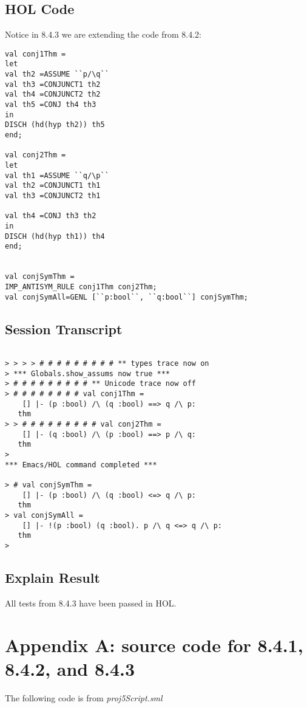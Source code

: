 \documentclass{report}
\begin{document}
\section{HOL Code}
\label{HOl Code 843}
Notice in 8.4.3 we are extending the code from 8.4.2:
\begin{lstlisting}[frame=trBL]
val conj1Thm =
let
val th2 =ASSUME ``p/\q``
val th3 =CONJUNCT1 th2
val th4 =CONJUNCT2 th2
val th5 =CONJ th4 th3
in
DISCH (hd(hyp th2)) th5
end;

val conj2Thm =
let
val th1 =ASSUME ``q/\p``
val th2 =CONJUNCT1 th1
val th3 =CONJUNCT2 th1

val th4 =CONJ th3 th2
in
DISCH (hd(hyp th1)) th4
end;


val conjSymThm =
IMP_ANTISYM_RULE conj1Thm conj2Thm;
val conjSymAll=GENL [``p:bool``, ``q:bool``] conjSymThm;
\end{lstlisting}

\section{Session Transcript}
\label{Session Trans 843}
\setcounter{sessioncount}{0}
\begin{session}
  \begin{scriptsize}
\begin{verbatim}

> > > > # # # # # # # # # ** types trace now on
> *** Globals.show_assums now true ***
> # # # # # # # # # ** Unicode trace now off
> # # # # # # # # val conj1Thm =
    [] |- (p :bool) /\ (q :bool) ==> q /\ p:
   thm
> > # # # # # # # # # val conj2Thm =
    [] |- (q :bool) /\ (p :bool) ==> p /\ q:
   thm
> 
*** Emacs/HOL command completed ***

> # val conjSymThm =
    [] |- (p :bool) /\ (q :bool) <=> q /\ p:
   thm
> val conjSymAll =
    [] |- !(p :bool) (q :bool). p /\ q <=> q /\ p:
   thm
> 
\end{verbatim}
  \end{scriptsize}
\end{session}
\section{Explain Result}
\label{explain result 843}
All tests from 8.4.3 have been passed in HOL.




\chapter{Appendix A: source code for 8.4.1, 8.4.2, and 8.4.3}
\label{cha:appendix-a:-source}


The following code is from \emph{proj5Script.sml}

\end{document}
